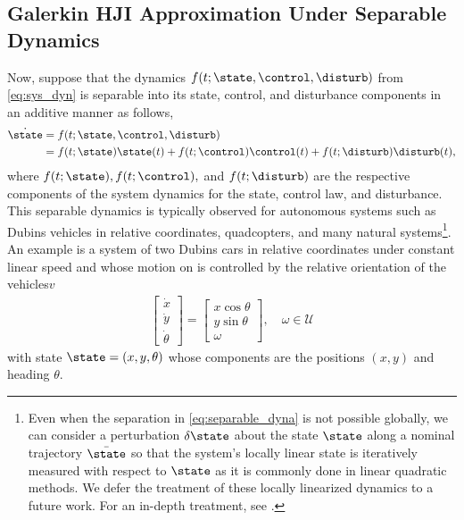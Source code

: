 \subsection{Galerkin HJI Approximation Under Separable Dynamics}
%
Now, suppose that the dynamics $f(t; \state, \control, \disturb)$ from \eqref{eq:sys_dyn} is separable into its state, control, and disturbance components in an additive manner as follows,
%
\begin{align}
	\dot{\state} &= f(t; \state, \control, \disturb) \\
				 &= f(t; {\state}) \state(t) + f(t; \control) \control(t) + f(t; \disturb) \disturb(t),
	\label{eq:separable_dyna}
\end{align}
%
where $f (t; \state), f(t; \control),$ and $f(t; \disturb)$ are the respective components of the system dynamics for the state, control law, and disturbance. This separable dynamics is typically observed for autonomous systems such as Dubins vehicles in relative coordinates, quadcopters, and many natural systems\footnote{Even when the separation in \eqref{eq:separable_dyna} is not possible globally, we can consider a perturbation $\delta \state$ about the state $\state$ along a nominal trajectory $\bar{\state}$ so that the system's locally linear state is iteratively measured with respect to $\state$ as it is commonly done in linear quadratic methods. We defer the treatment of these locally linearized dynamics to a future work. For an in-depth treatment, see \cite{DenhamDDP, Mitter1966, McReynolds1967, Jacobson1968new}.}. An example is a system of two Dubins cars in relative coordinates\cite{Merz1972} under constant linear speed and whose motion on is controlled by the relative orientation of the vehicles$v$ \ie 
%
\begin{align}
	\begin{bmatrix}
		\dot{x} \\ \dot{y} \\ \dot{\theta}
	\end{bmatrix} = \begin{bmatrix}
	x \cos \theta \\ y \sin \theta \\ \omega
\end{bmatrix}, \quad \omega \in \mathcal{U}
\end{align}
%
with state $\state=\left(x, y, \theta\right)$ whose components are the positions $(x, y)$ and heading $\theta$.
%
